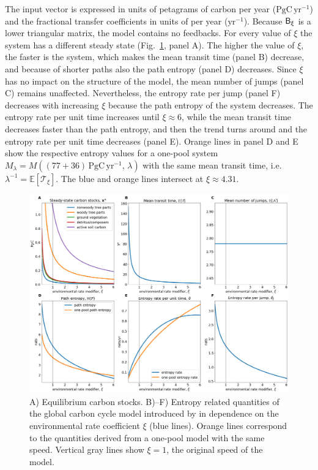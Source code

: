 \documentclass[smallextended]{svjour3}
\newcommand{\E}{\mathbb{E}}
\newcommand{\TT}{\mathcal{T}}
\newcommand{\peta}{\mathrm{P}}
\newcommand{\gC}{\mathrm{gC}}
\newcommand{\yr}{\mathrm{yr}}
\begin{document}
The input vector is expressed in units of petagrams of carbon per year ($\peta\gC\,\yr^{-1}$) and the fractional transfer coefficients in units of per year ($\yr^{-1}$).
Because $\mathsf{B}_\xi$ is a lower triangular matrix, the model contains no feedbacks.
For every value of $\xi$ the system has a different steady state (Fig.~\ref{fig:Emanuel_entropies}, panel A).
The higher the value of $\xi$, the faster is the system, which makes the mean transit time (panel B) decrease, and because of shorter paths also the path entropy (panel D) decreases.
Since $\xi$ has no impact on the structure of the model, the mean number of jumps (panel C) remains unaffected.
Nevertheless, the entropy rate per jump (panel F) decreases with increasing $\xi$ because the path entropy of the system decreases.
The entropy rate per unit time increases until $\xi\approx6$, while the mean transit time decreases faster than the path entropy, and then the trend turns around and the entropy rate per unit time decreases (panel E).
Orange lines in panel D and E show the respective entropy values for a one-pool system $M_\lambda=M((77+36)\,\peta\gC\,\yr^{-1},\, \lambda)$ with the same mean transit time, i.e. $\lambda^{-1} = \E\left[\TT_\xi\right]$.
The blue and orange lines intersect at $\xi\approx4.31$.

\begin{figure}[htbp]
    \centering
    \includegraphics[width=1.0\linewidth]{figs/Emanuel_entropies.png}
    \caption{
    A) Equilibrium carbon stocks. B)--F) Entropy related quantities of the global carbon cycle model introduced by \citet{Emanuel1981} in dependence on the environmental rate coefficient $\xi$ (blue lines).
    Orange lines correspond to the quantities derived from a one-pool model with the same speed.
    Vertical gray lines show $\xi=1$, the original speed of the model.}
    \label{fig:Emanuel_entropies}
\end{figure}
\end{document}
